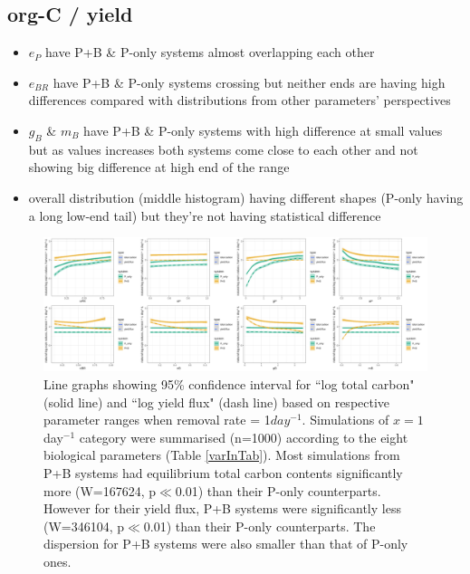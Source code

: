 \documentclass[../thesis.tex]{subfiles} %
\begin{document}
\subsection{org-C / yield}
\begin{itemize}
    \item $e_P$ have P+B \& P-only systems almost overlapping each other
    \item $e_{BR}$ have P+B \& P-only systems crossing but neither ends are having high differences compared with distributions from other parameters' perspectives
    \item $g_B$ \& $m_B$ have P+B \& P-only systems with high difference at small values but as values increases both systems come close to each other and not showing big difference at high end of the range
    \item overall distribution (middle histogram) having different shapes (P-only having a long low-end tail) but they're not having statistical difference
\end{itemize}

\begin{figure}[H]
    \centering
    \includegraphics[width=\linewidth]{../result/var_10.png}
    \caption[95\% distribution for $x=1day^{-1}$]{Line graphs showing 95\% confidence interval for ``log total carbon" (solid line) and ``log yield flux" (dash line) based on respective parameter ranges when removal rate = 1$day^{-1}$.  {\scriptsize Simulations of $x=1$day$^{-1}$ category were summarised (n=1000) according to the eight biological parameters (Table \ref{varInTab}).  Most simulations from P+B systems had equilibrium total carbon contents significantly more (W=167624, p$\ll$0.01) than their P-only counterparts.  However for their yield flux, P+B systems were significantly less (W=346104, p$\ll$0.01) than their P-only counterparts.  The dispersion for P+B systems were also smaller than that of P-only ones.}}
    \label{fig:v10}
\end{figure}
\end{document}
